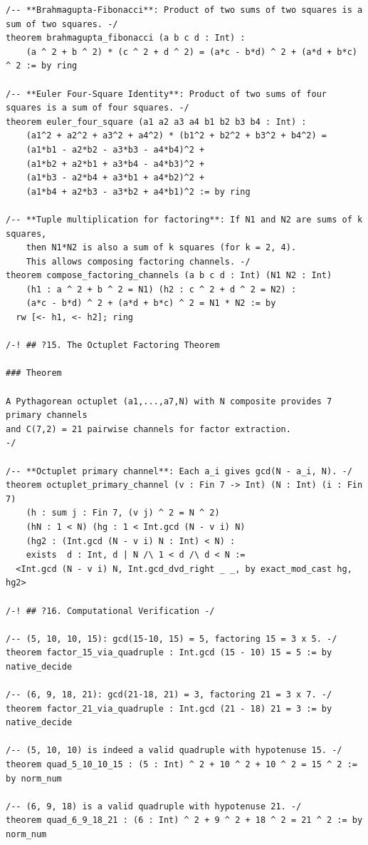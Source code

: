 \documentclass[11pt,twoside,openright]{book}
\theoremstyle{definition}
\theoremstyle{remark}
\begin{document}
\begin{lstlisting}[style=lean]
/-- **Brahmagupta-Fibonacci**: Product of two sums of two squares is a sum of two squares. -/
theorem brahmagupta_fibonacci (a b c d : Int) :
    (a ^ 2 + b ^ 2) * (c ^ 2 + d ^ 2) = (a*c - b*d) ^ 2 + (a*d + b*c) ^ 2 := by ring

/-- **Euler Four-Square Identity**: Product of two sums of four squares is a sum of four squares. -/
theorem euler_four_square (a1 a2 a3 a4 b1 b2 b3 b4 : Int) :
    (a1^2 + a2^2 + a3^2 + a4^2) * (b1^2 + b2^2 + b3^2 + b4^2) =
    (a1*b1 - a2*b2 - a3*b3 - a4*b4)^2 +
    (a1*b2 + a2*b1 + a3*b4 - a4*b3)^2 +
    (a1*b3 - a2*b4 + a3*b1 + a4*b2)^2 +
    (a1*b4 + a2*b3 - a3*b2 + a4*b1)^2 := by ring

/-- **Tuple multiplication for factoring**: If N1 and N2 are sums of k squares,
    then N1*N2 is also a sum of k squares (for k = 2, 4).
    This allows composing factoring channels. -/
theorem compose_factoring_channels (a b c d : Int) (N1 N2 : Int)
    (h1 : a ^ 2 + b ^ 2 = N1) (h2 : c ^ 2 + d ^ 2 = N2) :
    (a*c - b*d) ^ 2 + (a*d + b*c) ^ 2 = N1 * N2 := by
  rw [<- h1, <- h2]; ring

/-! ## ?15. The Octuplet Factoring Theorem

### Theorem

A Pythagorean octuplet (a1,...,a7,N) with N composite provides 7 primary channels
and C(7,2) = 21 pairwise channels for factor extraction.
-/

/-- **Octuplet primary channel**: Each a_i gives gcd(N - a_i, N). -/
theorem octuplet_primary_channel (v : Fin 7 -> Int) (N : Int) (i : Fin 7)
    (h : sum j : Fin 7, (v j) ^ 2 = N ^ 2)
    (hN : 1 < N) (hg : 1 < Int.gcd (N - v i) N)
    (hg2 : (Int.gcd (N - v i) N : Int) < N) :
    exists  d : Int, d | N /\ 1 < d /\ d < N :=
  <Int.gcd (N - v i) N, Int.gcd_dvd_right _ _, by exact_mod_cast hg, hg2>

/-! ## ?16. Computational Verification -/

/-- (5, 10, 10, 15): gcd(15-10, 15) = 5, factoring 15 = 3 x 5. -/
theorem factor_15_via_quadruple : Int.gcd (15 - 10) 15 = 5 := by native_decide

/-- (6, 9, 18, 21): gcd(21-18, 21) = 3, factoring 21 = 3 x 7. -/
theorem factor_21_via_quadruple : Int.gcd (21 - 18) 21 = 3 := by native_decide

/-- (5, 10, 10) is indeed a valid quadruple with hypotenuse 15. -/
theorem quad_5_10_10_15 : (5 : Int) ^ 2 + 10 ^ 2 + 10 ^ 2 = 15 ^ 2 := by norm_num

/-- (6, 9, 18) is a valid quadruple with hypotenuse 21. -/
theorem quad_6_9_18_21 : (6 : Int) ^ 2 + 9 ^ 2 + 18 ^ 2 = 21 ^ 2 := by norm_num


\end{lstlisting}
\end{document}
